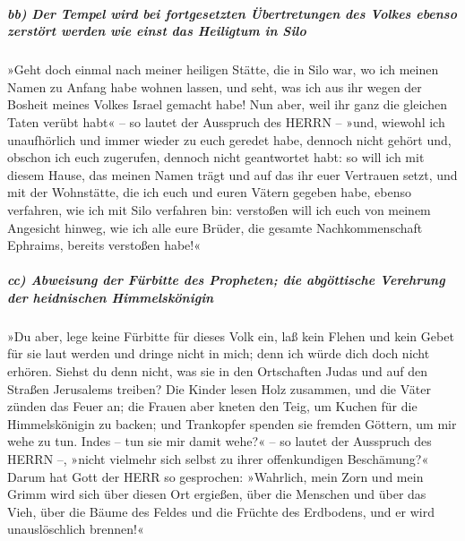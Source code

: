 \hypertarget{bb-der-tempel-wird-bei-fortgesetzten-uxfcbertretungen-des-volkes-ebenso-zerstuxf6rt-werden-wie-einst-das-heiligtum-in-silo}{%
\subparagraph{bb) Der Tempel wird bei fortgesetzten Übertretungen des
Volkes ebenso zerstört werden wie einst das Heiligtum in
Silo}\label{bb-der-tempel-wird-bei-fortgesetzten-uxfcbertretungen-des-volkes-ebenso-zerstuxf6rt-werden-wie-einst-das-heiligtum-in-silo}}

»Geht doch einmal nach meiner heiligen Stätte, die in
Silo war, wo ich meinen Namen zu Anfang habe wohnen lassen, und seht,
was ich aus ihr wegen der Bosheit meines Volkes Israel gemacht habe!
Nun aber, weil ihr ganz die gleichen Taten verübt habt«
-- so lautet der Ausspruch des HERRN -- »und, wiewohl ich unaufhörlich
und immer wieder zu euch geredet habe, dennoch nicht gehört und, obschon
ich euch zugerufen, dennoch nicht geantwortet habt: so
will ich mit diesem Hause, das meinen Namen trägt und auf das ihr euer
Vertrauen setzt, und mit der Wohnstätte, die ich euch und euren Vätern
gegeben habe, ebenso verfahren, wie ich mit Silo verfahren bin:
verstoßen will ich euch von meinem Angesicht hinweg, wie
ich alle eure Brüder, die gesamte Nachkommenschaft Ephraims, bereits
verstoßen habe!«

\hypertarget{cc-abweisung-der-fuxfcrbitte-des-propheten-die-abguxf6ttische-verehrung-der-heidnischen-himmelskuxf6nigin}{%
\subparagraph{cc) Abweisung der Fürbitte des Propheten; die abgöttische
Verehrung der heidnischen
Himmelskönigin}\label{cc-abweisung-der-fuxfcrbitte-des-propheten-die-abguxf6ttische-verehrung-der-heidnischen-himmelskuxf6nigin}}

»Du aber, lege keine Fürbitte für dieses Volk ein, laß
kein Flehen und kein Gebet für sie laut werden und dringe nicht in mich;
denn ich würde dich doch nicht erhören. Siehst du denn
nicht, was sie in den Ortschaften Judas und auf den Straßen Jerusalems
treiben? Die Kinder lesen Holz zusammen, und die Väter
zünden das Feuer an; die Frauen aber kneten den Teig, um Kuchen für die
Himmelskönigin zu backen; und Trankopfer spenden sie fremden Göttern, um
mir wehe zu tun. Indes -- tun sie mir damit wehe?« -- so
lautet der Ausspruch des HERRN --, »nicht vielmehr sich selbst zu ihrer
offenkundigen Beschämung?« Darum hat Gott der HERR so
gesprochen: »Wahrlich, mein Zorn und mein Grimm wird sich über diesen
Ort ergießen, über die Menschen und über das Vieh, über die Bäume des
Feldes und die Früchte des Erdbodens, und er wird unauslöschlich
brennen!«

